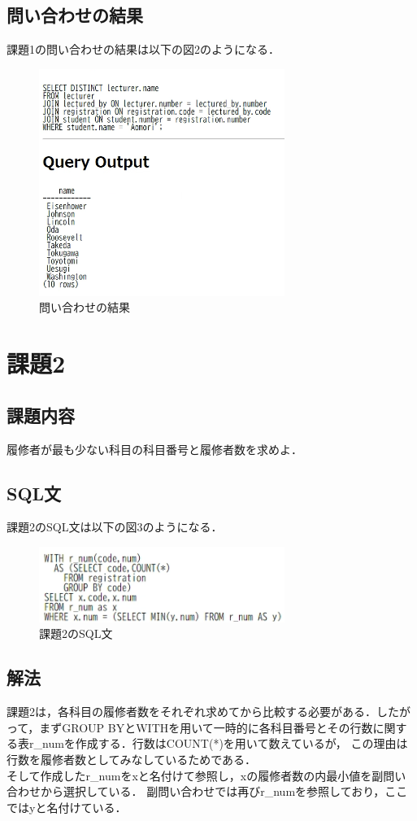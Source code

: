 \documentclass[dvipdfmx]{jarticle}
\begin{document}
\subsection{問い合わせの結果}
課題1の問い合わせの結果は以下の図2のようになる．
\begin{figure}[h]
    \centering
    \includegraphics[width = 8cm]{1.png}
    \caption{問い合わせの結果}
\end{figure}
\section{課題2}
\subsection{課題内容}
履修者が最も少ない科目の科目番号と履修者数を求めよ．
\subsection{SQL文}
課題2のSQL文は以下の図3のようになる．
\begin{figure}[h]
    \centering
    \includegraphics[width = 8cm]{sql2.png}
    \caption{課題2のSQL文}
\end{figure}
\subsection{解法}
課題2は，各科目の履修者数をそれぞれ求めてから比較する必要がある．したがって，まずGROUP BYとWITHを用いて一時的に各科目番号とその行数に関する表r\_numを作成する．行数はCOUNT(*)を用いて数えているが，
この理由は行数を履修者数としてみなしているためである．\\
そして作成したr\_numをxと名付けて参照し，xの履修者数の内最小値を副問い合わせから選択している．
副問い合わせでは再びr\_numを参照しており，ここではyと名付けている．
\end{document}
